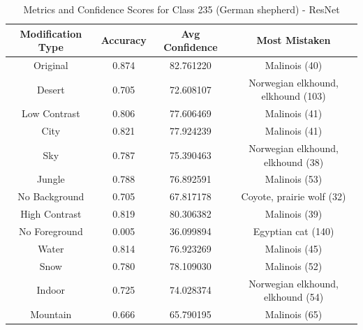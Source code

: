 \begin{table}
	\centering
	\begin{tabular}{|c|c|c|c|}
		\hline
		\textbf{Modification Type} & \textbf{Accuracy} & \textbf{Avg Confidence} & \textbf{Most Mistaken} \\
		\hline
		Original & 0.874 & 82.761220 & Malinois (40) \\
		\hline
		Desert & 0.705 & 72.608107 & Norwegian elkhound, elkhound (103) \\
		\hline
		Low Contrast & 0.806 & 77.606469 & Malinois (41) \\
		\hline
		City & 0.821 & 77.924239 & Malinois (41) \\
		\hline
		Sky & 0.787 & 75.390463 & Norwegian elkhound, elkhound (38) \\
		\hline
		Jungle & 0.788 & 76.892591 & Malinois (53) \\
		\hline
		No Background & 0.705 & 67.817178 & Coyote, prairie wolf (32) \\
		\hline
		High Contrast & 0.819 & 80.306382 & Malinois (39) \\
		\hline
		No Foreground & 0.005 & 36.099894 & Egyptian cat (140) \\
		\hline
		Water & 0.814 & 76.923269 & Malinois (45) \\
		\hline
		Snow & 0.780 & 78.109030 & Malinois (52) \\
		\hline
		Indoor & 0.725 & 74.028374 & Norwegian elkhound, elkhound (54) \\
		\hline
		Mountain & 0.666 & 65.790195 & Malinois (65) \\
		\hline
	\end{tabular}
	\caption{Metrics and Confidence Scores for Class 235 (German shepherd) - ResNet}
	\label{tab:metrics_confidence_class_235_resnet}
\end{table}

